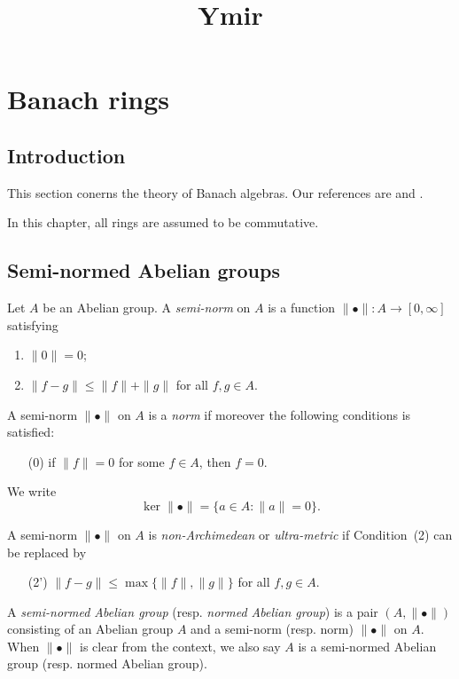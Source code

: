 
\title{Ymir}

\maketitle
\tableofcontents


\chapter*{Banach rings}\label{chap-Banach}
\section{Introduction}\label{sec-introduction-BanachRings}

This section conerns the theory of Banach algebras. Our references are \cite{Berk12} and \cite{BGR}.

In this chapter, all rings are assumed to be commutative.

\section{Semi-normed Abelian groups}

\begin{definition}
    Let $A$ be an Abelian group. A \emph{semi-norm} on $A$ is a function $\|\bullet\|:A\rightarrow [0,\infty]$ satisfying
    \begin{enumerate}
        \item $\|0\|=0$;
        \item $\|f-g\|\leq \|f\|+\|g\|$ for all $f,g\in A$.
    \end{enumerate}
    A semi-norm $\|\bullet\|$ on $A$ is a \emph{norm} if moreover the following conditions is satisfied:
    \begin{enumerate}
        \item[(0)] if $\|f\|=0$ for some $f\in A$, then $f=0$.
    \end{enumerate}
    We write
    \[
        \ker \|\bullet\|=\{a\in A:\|a\|=0\}.
    \]

    A semi-norm $\|\bullet\|$ on $A$ is \emph{non-Archimedean} or \emph{ultra-metric} if Condition~(2) can be replaced by
    \begin{enumerate}[resume]
        \item[(2')] $\|f-g\|\leq \max\{\|f\|,\|g\|\}$ for all $f,g\in A$.
    \end{enumerate}
\end{definition}
\begin{definition}
    A \emph{semi-normed Abelian group} (resp. \emph{normed Abelian group}) is a pair $(A,\|\bullet\|)$ consisting of an Abelian group $A$ and a semi-norm (resp. norm) $\|\bullet\|$ on $A$. When $\|\bullet\|$ is clear from the context, we also say $A$ is a semi-normed Abelian group (resp. normed Abelian group).
\end{definition}


